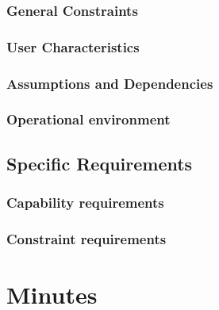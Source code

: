   \subsection{General Constraints}
    

  \subsection{User Characteristics}
    

  \subsection{Assumptions and Dependencies}
    

  \subsection{Operational environment}
    

\section{Specific Requirements}
  \subsection{Capability requirements}
    

  \subsection{Constraint requirements}
    


\appendix

\chapter{Minutes}
	



